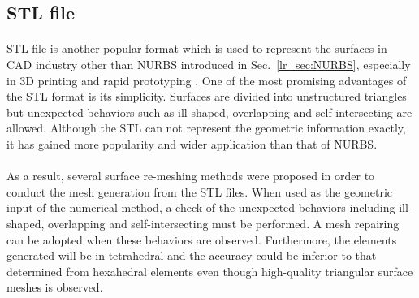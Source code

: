 \subsection{STL file}
\label{lr_sec:stl}
\paragraph{}
STL file is another popular format which is used to represent the surfaces in CAD industry other than NURBS introduced in Sec.~\ref{lr_sec:NURBS}, especially in 3D printing and rapid prototyping \citep{Rengier2010,doi:10.1080/10426910902997571}.
One of the most promising advantages of the STL format is its simplicity.
Surfaces are divided into unstructured triangles but unexpected behaviors such as ill-shaped, overlapping and self-intersecting are allowed.
Although the STL can not represent the geometric information exactly, it has gained more popularity and wider application than that of NURBS.

\paragraph{}
As a result, several surface re-meshing methods \citep{BECHET20021,Wang2007227} were proposed in order to conduct the mesh generation from the STL files.
When used as the geometric input of the numerical method, a check of the unexpected behaviors including ill-shaped, overlapping and self-intersecting must be performed.
A mesh repairing \citep{Attene:2013:PMR:2431211.2431214} can be adopted when these behaviors are observed.
Furthermore, the elements generated will be in tetrahedral and the accuracy could be inferior to that determined from hexahedral elements even though high-quality triangular surface meshes is observed.
